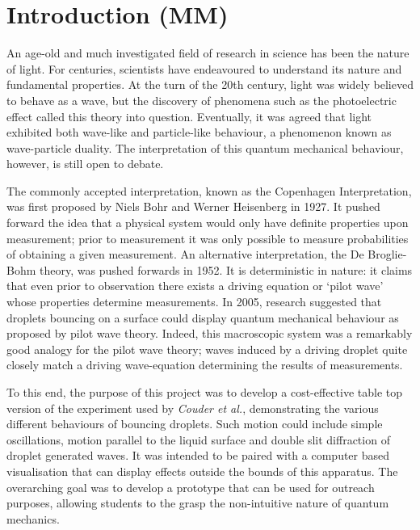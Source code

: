 \section{Introduction (MM)}
An age-old and much investigated field of research in science has been the nature of light. For centuries, scientists have endeavoured to understand its nature and fundamental properties. At the turn of the 20th century, light was widely believed to behave as a wave, but the discovery of phenomena such as the photoelectric effect called this theory into question. Eventually, it was agreed that light exhibited both wave-like and particle-like behaviour, a phenomenon known as wave-particle duality. The interpretation of this quantum mechanical behaviour, however, is still open to debate.

The commonly accepted interpretation, known as the Copenhagen Interpretation, was first proposed by Niels Bohr and Werner Heisenberg in 1927. It pushed forward the idea that a physical system would only have definite properties upon measurement; prior to measurement it was only possible to measure probabilities of obtaining a given measurement. An alternative interpretation, the De Broglie-Bohm theory, was pushed forwards in 1952. It is deterministic in nature: it claims that even prior to observation there exists a driving equation or `pilot wave' whose properties determine measurements. In 2005, research suggested \cite{couder} that droplets bouncing on a surface could display quantum mechanical behaviour as proposed by pilot wave theory. Indeed, this macroscopic system was a remarkably good analogy for the pilot wave theory; waves induced by a driving droplet quite closely match a driving wave-equation determining the results of measurements. 

To this end, the purpose of this project was to develop a cost-effective table top version of the experiment used by \textit{Couder et al.}, demonstrating the various different behaviours of bouncing droplets. Such motion could include simple oscillations, motion parallel to the liquid surface and double slit diffraction of droplet generated waves. It was intended to be paired with a computer based visualisation that can display effects outside the bounds of this apparatus. The overarching goal was to develop a prototype that can be used for outreach purposes, allowing  students to the grasp the non-intuitive nature of quantum mechanics. 

